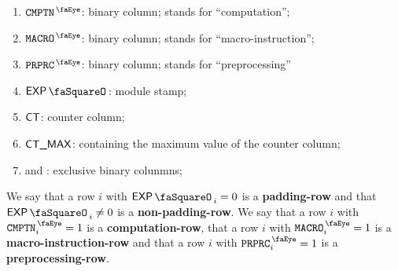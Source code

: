 \begin{enumerate}
      \item $\isComputation$:
            binary column;
            \expComputationSymbol{} stands for ``computation'';
      \item $\isMacro$:
            binary column;
            \expMacroSymbol{} stands for ``macro-instruction'';
      \item $\isPreprocessing$:
            binary column;
            \expPreprocessingSymbol{} stands for ``preprocessing''
      \item $\expStamp$:
            module stamp;
      \item $\textsf{CT}$: counter column;
      \item $\textsf{CT\_MAX}$: containing the maximum value of the counter column;
      \item \isExpLog{} and \isModexpLog{}:
            exclusive binary colunmns;
\end{enumerate}

We say that a row $i$ with
$\expStamp_{i} =    0$ is a \textbf{padding-row} and that
$\expStamp_{i} \neq 0$ is a \textbf{non-padding-row}.
We say that a row $i$ with  $\isComputation_{i} = 1$         is a \textbf{computation-row},
that a row $i$ with         $\isMacro_{i} = 1$         is a \textbf{macro-instruction-row}
and that a row $i$ with     $\isPreprocessing_{i} = 1$ is a \textbf{preprocessing-row}.
